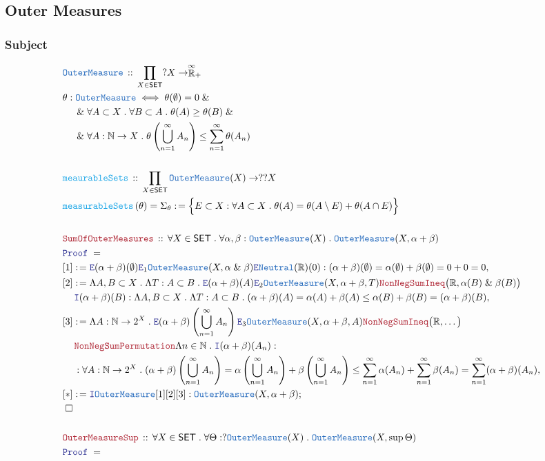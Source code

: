 \documentclass[12pt]{scrartcl}
\newcommand{\TYPE}[1]{\textcolor{NavyBlue}{\mathtt{#1}}}
\newcommand{\FUNC}[1]{\textcolor{Cerulean}{\mathtt{#1}}}
\newcommand{\LOGIC}[1]{\textcolor{Blue}{\mathtt{#1}}}
\newcommand{\THM}[1]{\textcolor{Maroon}{\mathtt{#1}}}
\renewcommand{\.}{\; . \;}
\newcommand{\de}{: \kern 0.1pc =}
\newcommand{\Act}[1]{\left( #1 \right)}
\newcommand{\Theorem}[2]{& \THM{#1} \, :: \, #2 \\ & \Proof = \\ }
\newcommand{\DeclareType}[2]{& \TYPE{#1} \, :: \, #2 \\}
\newcommand{\DefineType}[3]{& #1 : \TYPE{#2} \iff #3 \\}
\newcommand{\DeclareFunc}[2]{& \FUNC{#1} \, :: \, #2 \\}
\newcommand{\DefineNamedFunc}[4]{&  \FUNC{#1}\Act{#2} = #3 \de #4 \\}
\newcommand{\NewLine}{\\ & \kern 1pc}
\newcommand{\Page}[1]{ \begin{align*} #1 \end{align*}   }
\renewcommand{\And}{\; \& \;}
\newcommand{\Intro}{\LOGIC{I}}
\newcommand{\Elim}{\LOGIC{E}}
\newcommand{\Reals}{\mathbb{R} }
\newcommand{\Nat}{\mathbb{N} }
\newcommand{\EReals}{\stackrel{\mathclap{\infty}}{\mathbb{R}}}
\newcommand{\Say}[3]{& #1 \de #2 : #3, \\}
\newcommand{\Conclude}[3]{& #1 \de #2 : #3; \\}
\newcommand{\QED}{\; \square}
\newcommand{\EndProof}{& \QED \\}
\newcommand{\Proof}{\LOGIC{Proof} \; }
\newcommand{\SET}{\mathsf{SET}}
\newcommand{\OM}{\TYPE{OuterMeasure}}
\begin{document}
\subsection{Outer Measures}
\subsubsection{Subject}
\Page{
	\DeclareType{\OM}
	{
		\prod_{X \in \SET} ?X \to \EReals_+
	}
	\DefineType{\theta}{\OM}
	{
		\theta(\emptyset) = 0 \And \NewLine \And
		\forall A \subset X \. \forall B \subset A \. \theta(A) \ge \theta(B) \And \NewLine \And
		\forall A : \Nat \to X \. \theta\left( \bigcup^\infty_{n=1} A_n\right) \le \sum^\infty_{n=1} \theta(A_n)
	}
	\\
	\DeclareFunc{meaurableSets}
	{
		\prod_{X \in \SET} \OM(X) \to ??X
	}
	\DefineNamedFunc{measurableSets}{\theta}{\Sigma_\theta}
	{
		\Big\{ E \subset X : \forall A \subset X \. \theta(A) = \theta(A \setminus E) + \theta(A \cap E)   \Big\}
	}
	\\
	\Theorem{SumOfOuterMeasures}
	{
		\forall X \in \SET \.
		\forall \alpha,\beta : \OM(X) \.
		\OM(X,\alpha + \beta)
	}
	\Say{[1]}{\Elim (\alpha + \beta)(\emptyset)  \Elim_1 \OM(X,\alpha \And \beta) \Elim 
		\TYPE{Neutral}(\Reals)(0)
	}
	{
		(\alpha + \beta)(\emptyset) =
		\alpha(\emptyset) + \beta(\emptyset) = 
		0 + 0 =
		0
	}
	\Say{[2]}
	{
		\Lambda A,B \subset X \.
		\Lambda T : A \subset B \.
		\Elim 	(\alpha + \beta)(A)
		\Elim_2 \OM(X,\alpha + \beta, T) 
		\THM{NonNegSumIneq}\big(\Reals,\alpha(B) \And \beta(B)\big) \NewLine
		\Intro (\alpha + \beta)(B)
	}
	{
		\Lambda A,B \subset X \.
		\Lambda T : A \subset B \.
		(\alpha + \beta)(A) =
		\alpha(A) + \beta(A) \le 
		\alpha(B) + \beta(B)  =
		(\alpha + \beta)(B)
	}
	\Say{[3]}
	{
		\Lambda A : \Nat \to 2^X \.
		\Elim (\alpha + \beta)\left( \bigcup^\infty_{n=1} A_n \right)
		\Elim_3 \OM(X,\alpha + \beta,A)
		\THM{NonNegSumIneq}\big(\Reals,\ldots\big) \NewLine
		\THM{NonNegSumPermutation}
		\Lambda n \in \Nat \.
		\Intro (\alpha + \beta)(A_n)		
	}
	{
		\NewLine :		
		\forall A : \Nat \to 2^X \.
		(\alpha + \beta)\left( \bigcup^\infty_{n=1} A_n \right) =
		\alpha\left( \bigcup^\infty_{n=1} A_n \right) +
		\beta\left( \bigcup^\infty_{n=1} A_n \right) \le
		\sum^\infty_{n=1} \alpha(A_n) +
		\sum^\infty_{n=1} \beta(A_n) =
		\sum^\infty_{n=1} (\alpha + \beta)(A_n)		
	}
	\Conclude{[*]}{
		\Intro \OM [1][2][3]	
	}
	{
		\OM(X,\alpha + \beta)
	}
	\EndProof
	\\
	\Theorem{OuterMeasureSup}
	{
		\forall X \in \SET \.
		\forall \Theta : ?\OM(X) \.
		\OM(X,\sup \Theta)
}}
\end{document}
